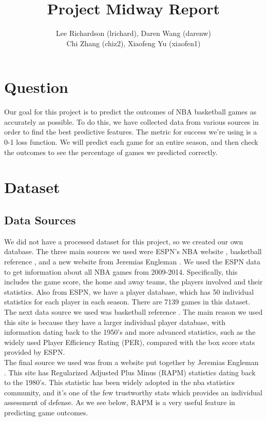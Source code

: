 \documentclass{article}
\title{Project Midway Report}
\author{Lee Richardson (lrichard), Daren Wang (darenw) \\ Chi Zhang (chiz2), Xiaofeng Yu (xiaofen1)\\}
\begin{document}
\maketitle

\section{Question}
	Our goal for this project is to predict the outcomes of NBA basketball games as accurately as possible. To do this, we have collected data from various sources in order to find the best predictive features. The metric for success we're using is a 0-1 loss function. We will predict each game for an entire season, and then check the outcomes to see the percentage of games we predicted correctly. 

\section{Dataset}
	
	\subsection{Data Sources}
	We did not have a processed dataset for this project, so we created our own database. The three main sources we used were ESPN's NBA website \cite{espn}, basketball reference \cite{bball_ref}, and a new website from Jeremias Engleman \cite{rpm_data}. We used the ESPN data to get information about all NBA games from 2009-2014. Specifically, this includes the game score, the home and away teams, the players involved and their statistics. Also from ESPN, we have a player database, which has 50 individual statistics for each player in each season. There are 7139 games in this dataset. \\

	The next data source we used was basketball reference \cite{bball_ref}. The main reason we used this site is because they have a larger individual player database, with information dating back to the 1950's and more advanced statistics, such as the widely used Player Efficiency Rating (PER), compared with the box score stats provided by ESPN. \\

	The final source we used was from a website put together by Jeremias Engleman \cite{rpm_data}. This site has Regularized Adjusted Plus Minus (RAPM) statistics dating back to the 1980's. This statistic has been widely adopted in the nba statistics community, and it's one of the few trustworthy stats which provides an individual assessment of defense. As we see below, RAPM is a very useful feature in predicting game outcomes. \\
\end{document}
